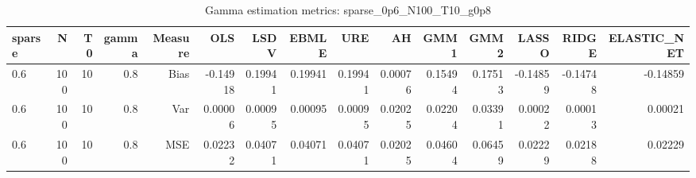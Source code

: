 \begin{table}[!htbp]\centering
\caption{Gamma estimation metrics: sparse_0p6_N100_T10_g0p8}
\label{tab:table1_sparse_0p6_N100_T10_g0p8}
\begin{tabular}{lrrrrrrrrrrrrrr}
\hline
sparse & N & T0 & gamma & Measure & OLS & LSDV & EBMLE & URE & AH & GMM1 & GMM2 & LASSO & RIDGE & ELASTIC_NET \\
\hline
0.6 & 100 & 10 & 0.8 & Bias & -0.14918 & 0.19941 & 0.19941 & 0.19941 & 0.00076 & 0.15494 & 0.17513 & -0.14859 & -0.14748 & -0.14859 \\
0.6 & 100 & 10 & 0.8 & Var & 0.00006 & 0.00095 & 0.00095 & 0.00095 & 0.02025 & 0.02204 & 0.03391 & 0.00022 & 0.00013 & 0.00021 \\
0.6 & 100 & 10 & 0.8 & MSE & 0.02232 & 0.04071 & 0.04071 & 0.04071 & 0.02025 & 0.04604 & 0.06459 & 0.02229 & 0.02188 & 0.02229 \\
\hline
\end{tabular}
\end{table}

